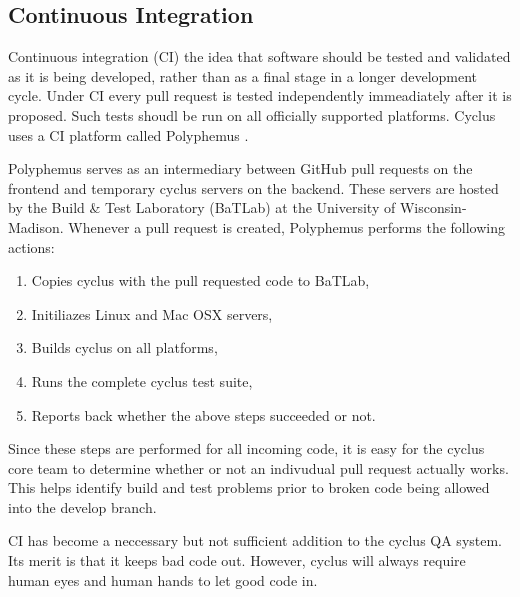 \subsection{Continuous Integration}
\label{sec:qa-ci}

Continuous integration (CI) the idea that software should be tested and validated 
as it is being developed, rather than as a final stage in a longer development 
cycle.  Under CI every pull request is tested independently immeadiately after 
it is proposed. Such tests shoudl be run on all officially supported platforms. 
Cyclus uses a CI platform called Polyphemus \cite{scopatz_polyphemus_2014}. 

Polyphemus serves as an intermediary between GitHub pull requests on the frontend 
and temporary cyclus servers on the backend. These servers are hosted by 
the Build \& Test Laboratory (BaTLab) \cite{uw_batlab_team_batlab_2014} at the University of 
Wisconsin-Madison. Whenever a pull request is created, Polyphemus performs 
the following actions:

\begin{enumerate}
    \item Copies cyclus with the pull requested code to BaTLab,
    \item Initiliazes Linux and Mac OSX servers,
    \item Builds cyclus on all platforms,
    \item Runs the complete cyclus test suite, 
    \item Reports back whether the above steps succeeded or not.
\end{enumerate}

Since these steps are performed for all incoming code, it is easy for the 
cyclus core team to determine whether or not an indivudual pull request 
actually works. This helps identify build and test problems prior to 
broken code being allowed into the develop branch.

CI has become a neccessary but not sufficient addition to the cyclus QA
system. Its merit is that it keeps bad code out. However, cyclus will always
require human eyes and human hands to let good code in.


